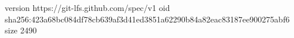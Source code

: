version https://git-lfs.github.com/spec/v1
oid sha256:423a68bc084df78cb639af3d41ed3851a62290b84a82eac83187ee900275abf6
size 2490
